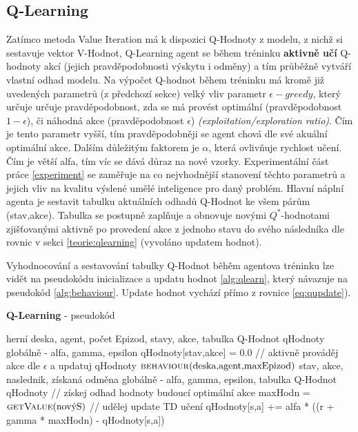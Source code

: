 \subsection{Q-Learning}
\label{navrh:qlearnagent}
Zatímco metoda Value Iteration má k dispozici Q-Hodnoty z modelu, z nichž si sestavuje vektor V-Hodnot, Q-Learning agent se během tréninku \textbf{aktivně učí} Q-hodnoty akcí (jejich pravděpodobnosti výskytu i odměny) a tím průběžně vytváří vlastní odhad modelu. Na výpočet Q-hodnot během tréninku má kromě již uvedených parametrů (z předchozí sekce) velký vliv parametr $\epsilon-greedy$, který určuje určuje pravděpodobnost, zda se má provést optimální (pravděpodobnost $1-\epsilon$), či náhodná akce (pravděpodobnost $\epsilon$) \textit{(exploitation/exploration ratio)}. Čím je tento parametr vyšší, tím pravděpodobněji se agent chová dle své akuální optimální akce. Dalším důležitým faktorem je $\alpha$, která ovlivňuje rychlost učení. Čím je větší alfa, tím víc se dává důraz na nové vzorky. Experimentální část práce \ref{experiment} se zaměřuje na co nejvhodnější stanovení těchto parametrů a jejich vliv na kvalitu výslené umělé inteligence pro daný problém.
\newline
Hlavní náplní agenta je sestavit tabulku aktuálních odhadů Q-Hodnot ke všem párům (stav,akce). Tabulka se postupně zaplňuje a obnovuje novými $Q^*$-hodnotami zjišťovanými aktivně po provedení akce z jednoho stavu do svého následníka dle rovnic v sekci \ref{teorie:qlearning} (vyvoláno updatem hodnot).

Vyhodnocování a sestavování tabulky Q-Hodnot běhěm agentova tréninku lze vidět na pseudokódu inicializace a updatu hodnot \ref{alg:qlearn}, který návazuje na pseudokód \ref{alg:behaviour}. Update hodnot vychází přímo z rovnice \ref{eq:qupdate}).
\begin{algorithm}
\caption{\textbf{Q-Learning} - pseudokód}
\label{alg:qlearn}
\begin{algorithmic}[1]
\Require herní deska, agent, počet Epizod, stavy, akce, tabulka Q-Hodnot qHodnoty
\Require globálně - alfa, gamma, epsilon
      \State qHodnoty[stav,akce] = 0.0 
    \EndFor
  \EndFor
  \State // aktivně prováděj akce dle $\epsilon$ a updatuj qHodnoty
  \State $\text{\Call{behaviour}{deska,agent,maxEpizod}}$
\EndProcedure
\algrule
\Require stav, akce, naslednik, získaná odměna
\Require globálně - alfa, gamma, epsilon, tabulka Q-Hodnot qHodnoty
  \State // získej odhad hodnoty budoucí optimální akce
  \State maxHodn = $\text{\Call{getValue}{novýS}}$
  \State // udělej update TD učení
  \State qHodnoty[s,a] +=  alfa * ((r + gamma * maxHodn) - qHodnoty[s,a])
\EndProcedure
\end{algorithmic}
\end{algorithm}
\newpage


